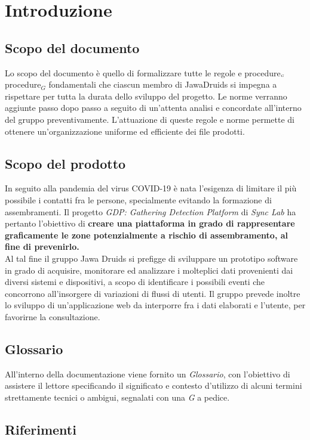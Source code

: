 \chapter{Introduzione}\label{Introduzione}

\section{Scopo del documento}\label{IntroduzioneScopoDelDocumento}
Lo scopo del documento è quello di formalizzare tutte le regole e procedure$_{\scaleto{G}{3pt}}$  procedure$_G$ fondamentali che ciascun membro di JawaDruids si impegna a rispettare per tutta la durata dello sviluppo del progetto. 
Le norme verranno aggiunte passo dopo passo a seguito di un'attenta analisi e concordate all'interno del gruppo preventivamente. L'attuazione di queste regole e norme permette di ottenere un'organizzazione uniforme ed efficiente dei file prodotti.
\section{Scopo del prodotto}\label{1.2}
In seguito alla pandemia del virus COVID-19 è nata l'esigenza di limitare il più possibile i contatti fra le persone, specialmente evitando la formazione di assembramenti. Il progetto \textit{GDP: Gathering Detection Platform} di \textit{Sync Lab} ha pertanto l'obiettivo di \textbf{creare una piattaforma in grado di rappresentare graficamente le zone potenzialmente a rischio di assembramento, al fine di prevenirlo.}\\
Al tal fine il gruppo Jawa Druids si prefigge di sviluppare un prototipo software in grado di acquisire, monitorare ed analizzare i molteplici dati provenienti dai diversi sistemi e dispositivi, a scopo di identificare i possibili eventi che concorrono all’insorgere di variazioni di flussi di utenti. Il gruppo prevede inoltre lo sviluppo di un'applicazione web da interporre fra i dati elaborati e l'utente, per favorirne la consultazione.
\section{Glossario}\label{1.3}
All'interno della documentazione viene fornito un \textit{Glossario}, con l'obiettivo di assistere il lettore specificando il significato e contesto d'utilizzo di alcuni termini strettamente tecnici o ambigui, segnalati con una \textit{G} a pedice.

\section{Riferimenti}\label{IntroduzioneRiferimenti}
